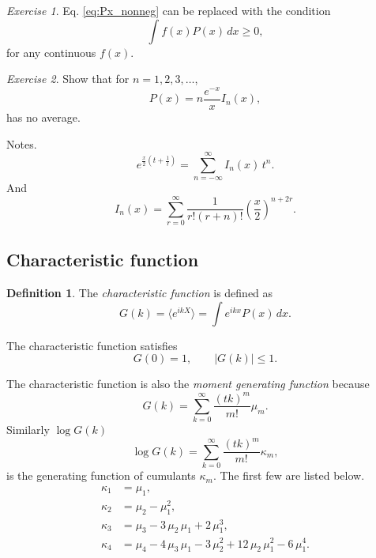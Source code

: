 \documentclass{book}
\numberwithin{equation}{section}
\theoremstyle{plain}
\theoremstyle{definition}
\newtheorem{defn}{Definition}[section]
\theoremstyle{remark}
\theoremstyle{BoldStyle}
\newtheorem{exercise}{Exercise}
\numberwithin{exercise}{section}
\begin{document}
\begin{exercise}
Eq. \eqref{eq:Px_nonneg} can be replaced with the condition
$$
\int f(x) P(x) \, dx \ge 0,
$$
for any continuous $f(x)$.
\end{exercise}


\begin{exercise}
Show that for $n = 1, 2, 3, \dots$,
$$
P(x) = n \frac{e^{-x}}{x} I_n(x),
$$
has no average.

Notes.
$$
e^{ \frac{x}{2} \left( t + \frac{1}{t} \right) }
= \sum_{n = -\infty}^\infty I_n(x) \, t^n.
$$
And
$$
I_n(x) = \sum_{r = 0}^\infty \frac{1}{r! (r + n)!} \left(\frac x 2\right)^{n+2r}.
$$
\end{exercise}



\subsection*{Characteristic function}

\begin{defn}
The \emph{characteristic function} is defined as
\begin{equation}
G(k) = \langle e^{ikX} \rangle
=
\int e^{ikx} P(x) \, dx.
\end{equation}
\end{defn}

The characteristic function satisfies
\begin{equation}
  G(0) = 1, \qquad
  |G(k)| \le 1.
\end{equation}


The characteristic function is also the \emph{moment generating function}
because
\begin{equation}
  G(k) = \sum_{k = 0}^\infty \frac{(tk)^m } {m!} \mu_m.
  \label{eq:mugen}
\end{equation}
Similarly $\log G(k)$
\begin{equation}
  \log G(k) = \sum_{k = 0}^\infty \frac{(tk)^m } {m!} \kappa_m,
  \label{eq:kappagen}
\end{equation}
is the generating function of cumulants $\kappa_m$.
The first few are listed below.
\begin{equation}
  \begin{aligned}
    \kappa_1 &= \mu_1, \\
    \kappa_2 &= \mu_2 - \mu_1^2, \\
    \kappa_3 &= \mu_3 -3 \, \mu_2 \, \mu_1 + 2 \, \mu_1^3, \\
    \kappa_4 &= \mu_4 -4 \, \mu_3 \, \mu_1 - 3 \, \mu_2^2 + 12 \, \mu_2 \, \mu_1^2 - 6 \, \mu_1^4.
  \end{aligned}
\end{equation}
\end{document}

